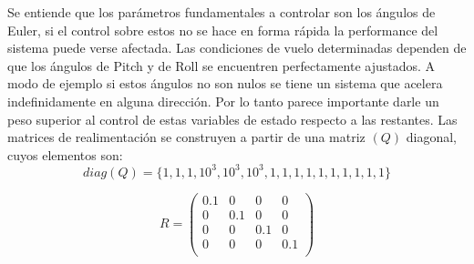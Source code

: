 \documentclass[main]{subfiles}
\begin{document}
Se entiende que los par\'ametros fundamentales a controlar son los \'angulos de Euler, si el control sobre estos no se hace en forma r\'apida la performance del sistema puede verse afectada.  Las condiciones de vuelo determinadas dependen de que los \'angulos de Pitch y de Roll se encuentren perfectamente ajustados. A modo de ejemplo si estos \'angulos no son nulos se tiene un sistema que acelera indefinidamente en alguna direcci\'on. Por lo tanto parece importante darle un peso superior al control de estas variables de estado respecto a las restantes. Las matrices de realimentaci\'on se construyen a partir de una matriz $(Q)$ diagonal, cuyos elementos son:
\begin{equation}
\label{eq:Q}
diag(Q) = \{1, 1, 1, 10^{3},10^{3},10^{3},1,1,1,1,1,1,1,1,1,1 \}
\end{equation}


\begin{equation}
\label{eq:R}
R = \left(\begin{array}{cccc}
0.1 & 0 & 0 & 0\\
0 & 0.1 & 0 & 0\\
0 & 0 & 0.1 & 0\\
0 & 0 & 0 & 0.1\\
\end{array}\right)
\end{equation}
\end{document}
